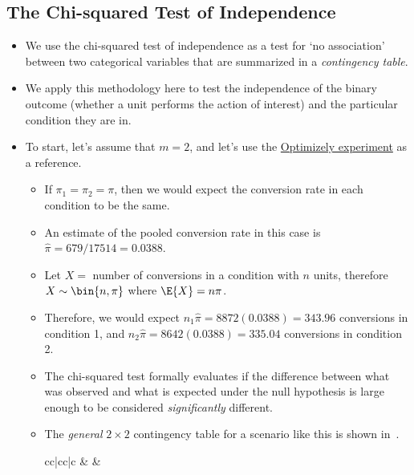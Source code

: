 \subsection{The Chi-squared Test of Independence}
\begin{itemize}
      \item We use the chi-squared test of independence as a test for `no association'
            between two categorical variables that are summarized in a \emph{contingency table}.
      \item We apply this methodology here to test the independence of the binary outcome
            (whether a unit performs the action of interest) and the particular condition they are in.
      \item To start, let's assume that $ m=2 $, and let's use the \hyperref[ex:optimizely_ex1]{Optimizely experiment} as a reference.
            \begin{itemize}
                  \item If $ \pi_1=\pi_2=\pi $, then we would expect the conversion rate in each condition to be the same.
                  \item An estimate of the pooled conversion rate in this case is $ \hat{\pi}=679/17514=0.0388 $.
                  \item Let $ X= $ number of conversions in a condition with $ n $ units, therefore $ X \sim \bin{n,\pi} $
                        where $ \E{X}=n\pi $.
                  \item Therefore, we would expect $ n_1\hat{\pi}=8872(0.0388)=343.96 $ conversions in condition 1,
                        and $ n_2\hat{\pi}=8642(0.0388)=335.04 $ conversions in condition 2.
                  \item The chi-squared test formally evaluates if the difference between what
                        was observed and what is expected under the null hypothesis is large enough
                        to be considered \emph{significantly} different.
                  \item The \emph{general} $ 2\times 2 $ contingency table for a scenario like this
                        is shown in~.
                        \begin{table}[!htbp]
                              \centering
                              \caption{A General $ 2\times 2 $ Contingency Table}\label{general_22_contingency}
                              \begin{NiceTabular}{cc|cc|c}
                                            &  &                                                                                       \\

\end{NiceTabular}
\end{table}
\end{itemize}
\end{itemize}
